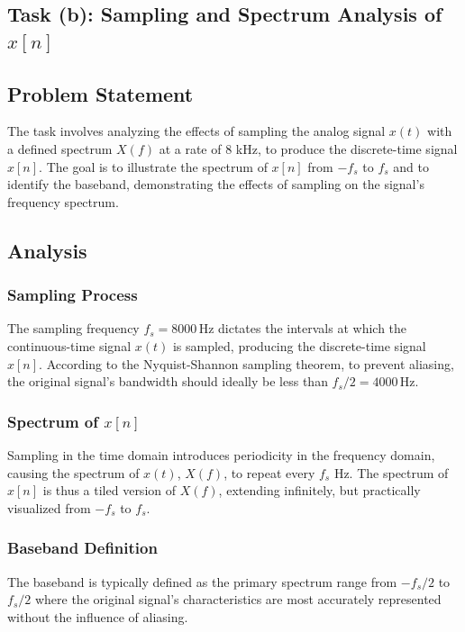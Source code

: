 
\item[(b)]
\subsection{Task (b): Sampling and Spectrum Analysis of $x[n]$}

\subsection{Problem Statement}
The task involves analyzing the effects of sampling the analog signal $x(t)$ with a defined spectrum $X(f)$ at a rate of 8 kHz, to produce the discrete-time signal $x[n]$. The goal is to illustrate the spectrum of $x[n]$ from $-f_s$ to $f_s$ and to identify the baseband, demonstrating the effects of sampling on the signal's frequency spectrum.

\subsection{Analysis}
\subsubsection{Sampling Process}
The sampling frequency $f_s = 8000 \, \text{Hz}$ dictates the intervals at which the continuous-time signal $x(t)$ is sampled, producing the discrete-time signal $x[n]$. According to the Nyquist-Shannon sampling theorem, to prevent aliasing, the original signal’s bandwidth should ideally be less than $f_s/2 = 4000 \, \text{Hz}$.

\subsubsection{Spectrum of $x[n]$}
Sampling in the time domain introduces periodicity in the frequency domain, causing the spectrum of $x(t)$, $X(f)$, to repeat every $f_s$ Hz. The spectrum of $x[n]$ is thus a tiled version of $X(f)$, extending infinitely, but practically visualized from $-f_s$ to $f_s$.

\subsubsection{Baseband Definition}
The baseband is typically defined as the primary spectrum range from $-f_s/2$ to $f_s/2$ where the original signal's characteristics are most accurately represented without the influence of aliasing.

